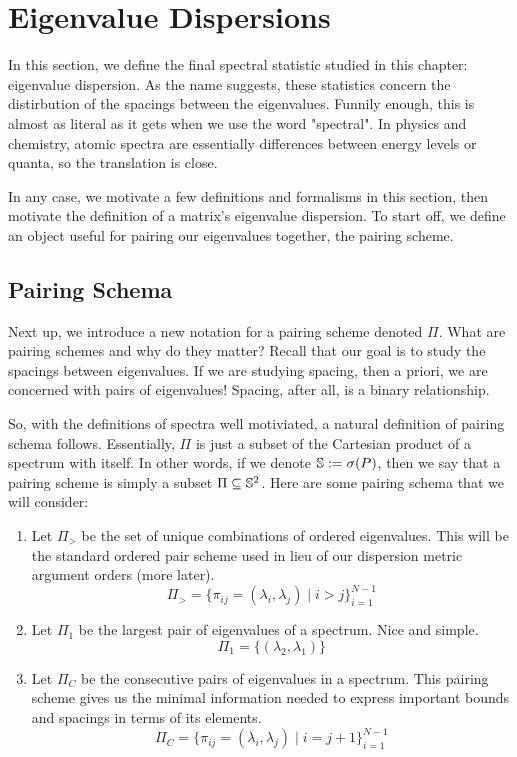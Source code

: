 \section{Eigenvalue Dispersions}

In this section, we define the final spectral statistic studied in this chapter: eigenvalue dispersion. As the name suggests, these statistics concern the distirbution of the spacings between the eigenvalues. Funnily enough, this is almost as literal as it gets when we use the word "spectral". In physics and chemistry, atomic spectra are essentially differences between energy levels or quanta, so the translation is close. 

In any case, we motivate a few definitions and formalisms in this section, then motivate the definition of a matrix's eigenvalue dispersion. To start off, we define an object useful for pairing our eigenvalues together, the pairing scheme.


\subsection{Pairing Schema}

Next up, we introduce a new notation for a pairing scheme denoted $\Pi$. What are pairing schemes and why do they matter? Recall that our goal is to study the spacings between eigenvalues. If we are studying spacing, then a priori, we are concerned with pairs of eigenvalues! Spacing, after all, is a binary relationship. 

So, with the definitions of spectra well motiviated, a natural definition of pairing schema follows. Essentially, $\Pi$ is just a subset of the Cartesian product of a spectrum with itself. In other words, if we denote $\S := \sigma(P)$, then we say that a pairing scheme is simply a subset $\Pi \subseteq \S^2$. Here are some pairing schema that we will consider:

\begin{enumerate}
\item Let $\Pi_>$ be the set of unique combinations of ordered eigenvalues. This will be the standard ordered pair scheme used in lieu of our dispersion metric argument orders (more later).
$$\Pi_> = \{\pi_{ij} = (\lambda_i,\lambda_j) \mid i > j\}_{i = 1}^{N-1}$$
\item Let $\Pi_1$ be the largest pair of eigenvalues of a spectrum. Nice and simple.
$$\Pi_1 = \{(\lambda_2,\lambda_1)\}$$
\item Let $\Pi_C$ be the consecutive pairs of eigenvalues in a spectrum. This pairing scheme gives us the minimal information needed to express important bounds and spacings in terms of its elements.
$$\Pi_C = \{\pi_{ij} = (\lambda_i,\lambda_j) \mid i = j + 1\}_{i = 1}^{N-1}$$
\end{enumerate}

